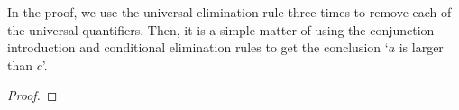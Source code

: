 

\smallskip
In the proof, we use the universal elimination rule three times to remove each of the universal quantifiers. Then, it is a simple matter of using the conjunction introduction and conditional elimination rules to get the conclusion `$a$ is larger than $c$'.


\begin{proof}
	 \pr{}
	 \pr{}
	 \pr{}
	 
	 
	 
	 
	 
\end{proof}


